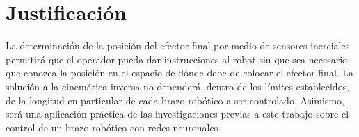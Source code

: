 \section{Justificación}

La determinación de la posición del efector final por medio de sensores inerciales permitirá que el operador pueda dar instrucciones al robot sin que sea necesario que conozca la posición en el espacio de dónde debe de colocar el efector final. La solución a la cinemática inversa no dependerá, dentro de los límites establecidos, de la longitud en particular de cada brazo robótico a ser controlado. Asimismo, será una aplicación práctica de las investigaciones previas a este trabajo sobre el control de un brazo robótico con redes neuronales.